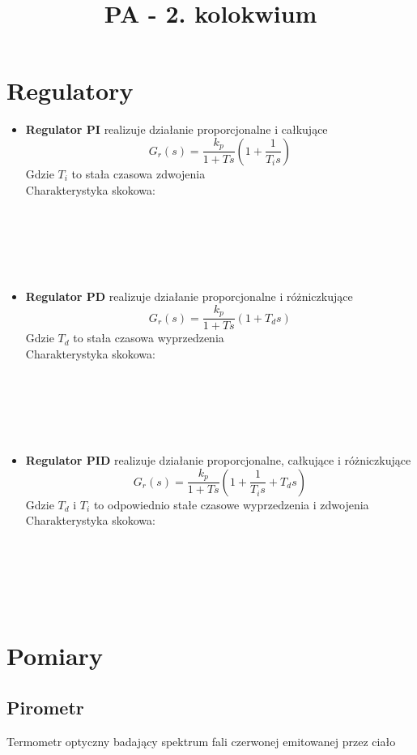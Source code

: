\documentclass[a4paper]{article}
\author{}
\title{PA - 2. kolokwium}
\date{}
\begin{document}
\maketitle
\section{Regulatory}
\begin{itemize}
\item \textbf{Regulator PI} realizuje działanie proporcjonalne i całkujące \\
$$G_r(s) = \frac{k_p}{1+Ts}(1+\frac{1}{T_is}) $$
Gdzie $T_i$ to stała czasowa zdwojenia\\
Charakterystyka skokowa: \\\\\\\\\\\\
\item \textbf{Regulator PD} realizuje działanie proporcjonalne i różniczkujące \\
$$G_r(s) = \frac{k_p}{1+Ts}(1+T_ds) $$
Gdzie $T_d$ to stała czasowa wyprzedzenia\\
Charakterystyka skokowa: \\\\\\\\\\\\
\item \textbf{Regulator PID} realizuje działanie proporcjonalne, całkujące i różniczkujące\\
$$G_r(s) = \frac{k_p}{1+Ts}(1+\frac{1}{T_is}+T_ds)$$
Gdzie $T_d$ i $T_i$ to odpowiednio stałe czasowe wyprzedzenia i zdwojenia
Charakterystyka skokowa: \\\\\\\\\\\\
\end{itemize}
\section{Pomiary}

\subsection{Pirometr}
Termometr optyczny badający spektrum fali czerwonej emitowanej przez ciało
\end{document}
